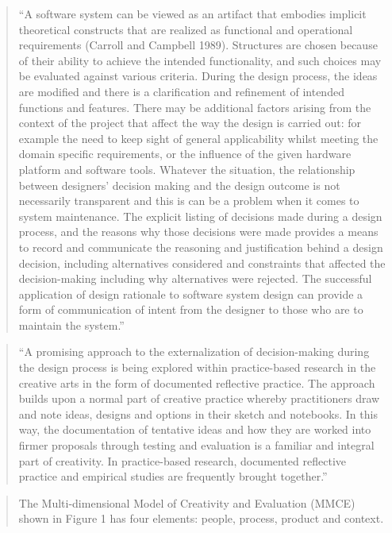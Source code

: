 \begin{quote}
  ``A software system can be viewed as an artifact that embodies implicit theoretical constructs that are realized as functional and operational requirements (Carroll and Campbell 1989). Structures are chosen because of their ability to achieve the intended functionality, and such choices may be evaluated against various criteria. During the design process, the ideas are modified and there is a clarification and refinement of intended functions and features. There may be additional factors arising from the context of the project that affect the way the design is carried out: for example the need to keep sight of general applicability whilst meeting the domain specific requirements, or the influence of the given hardware platform and software tools. Whatever the situation, the relationship between designers' decision making and the design outcome is not necessarily transparent and this is can be a problem when it comes to system maintenance. The explicit listing of decisions made during a design process, and the reasons why those decisions were made provides a means to record and communicate the reasoning and justification behind a design decision, including alternatives considered and constraints that affected the decision-making including why alternatives were rejected. The successful application of design rationale to software system design can provide a form of communication of intent from the designer to those who are to maintain the system.'' \parencite[p.9]{Candy2012}
\end{quote}

\begin{quote}
  ``A promising approach to the externalization of decision-making during the design process is being explored within practice-based research in the creative arts in the form of documented reflective practice. The approach builds upon a normal part of creative practice whereby practitioners draw and note ideas, designs and options in their sketch and notebooks. In this way, the documentation of tentative ideas and how they are worked into firmer proposals through testing and evaluation is a familiar and integral part of creativity. In practice-based research, documented reflective practice and empirical studies are frequently brought together.'' \parencite[p.10]{Candy2012}
\end{quote}

\begin{quote}
  The Multi-dimensional Model of Creativity and Evaluation (MMCE) shown in Figure 1 has four elements: people, process, product and context. \parencite[p.11]{Candy2012}
\end{quote}

